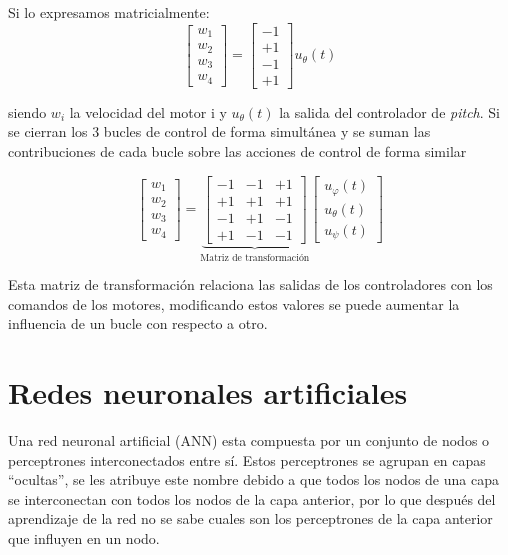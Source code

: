 Si lo expresamos matricialmente:
\begin{equation}
	\left[\begin{array}{c}
		w_1\\
	w_2\\
	w_3\\
	w_4
	\end{array}\right] =\left[\begin{array}{c}
	-1 \\
	 +1 \\
	  -1 \\
	   +1
	\end{array}\right] u_\theta(t) 
\end{equation}

siendo $w_i$ la velocidad del motor i y $u_\theta(t)$ la salida del controlador de \textit{pitch}. Si se cierran los 3 bucles de control de forma simultánea y se suman las contribuciones de cada bucle sobre las acciones de control de forma similar


\begin{equation}
\left[\begin{array}{c}
w_1\\
w_2\\
w_3\\
w_4
\end{array}\right] =\underbrace{\left[\begin{array}{ccc}
-1 & -1 & +1 \\
+1 & +1 & +1 \\
-1 & +1 & -1 \\
+1 & -1 & -1
\end{array}\right]}_{\text{Matriz de transformación}}
\left[\begin{array}{c}
u_\varphi(t)\\
u_\theta(t)\\
u_\psi(t)
\end{array}\right]
\end{equation}

Esta matriz de transformación relaciona las salidas de los controladores con los comandos de los motores, modificando estos valores se puede aumentar la influencia de un bucle con respecto a otro.

\section{Redes neuronales artificiales} 
 Una red neuronal artificial (ANN) esta compuesta por un conjunto de nodos o perceptrones interconectados entre sí. Estos perceptrones se agrupan en capas ``ocultas'', se les atribuye este nombre debido a que todos los nodos de una capa se interconectan con todos los nodos de la capa anterior, por lo que después del aprendizaje de la red no se sabe cuales son los perceptrones de la capa anterior que influyen en un nodo.
 
